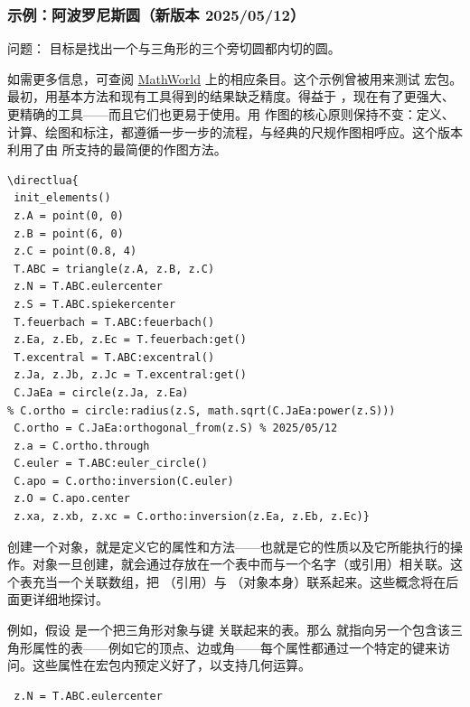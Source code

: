 \subsubsection{示例：阿波罗尼斯圆（新版本 2025/05/12）}
\label{ssub:example_apollonius_circle}

\begin{mybox}{问题：}
目标是找出一个与三角形的三个旁切圆都内切的圆。\end{mybox}


如需更多信息，可查阅 \href{https://mathworld.wolfram.com/ApolloniusCircle.html}{MathWorld} 上的相应条目。这个示例曾被用来测试  宏包。最初，用基本方法和现有工具得到的结果缺乏精度。得益于 ，现在有了更强大、更精确的工具——而且它们也更易于使用。用  作图的核心原则保持不变：定义、计算、绘图和标注，都遵循一步一步的流程，与经典的尺规作图相呼应。这个版本利用了由  所支持的最简便的作图方法。


\begin{mybox}
\begin{verbatim}
\directlua{
 init_elements()
 z.A = point(0, 0)
 z.B = point(6, 0)
 z.C = point(0.8, 4)
 T.ABC = triangle(z.A, z.B, z.C)
 z.N = T.ABC.eulercenter
 z.S = T.ABC.spiekercenter
 T.feuerbach = T.ABC:feuerbach()
 z.Ea, z.Eb, z.Ec = T.feuerbach:get()
 T.excentral = T.ABC:excentral()
 z.Ja, z.Jb, z.Jc = T.excentral:get()
 C.JaEa = circle(z.Ja, z.Ea)
% C.ortho = circle:radius(z.S, math.sqrt(C.JaEa:power(z.S)))
 C.ortho = C.JaEa:orthogonal_from(z.S) % 2025/05/12
 z.a = C.ortho.through
 C.euler = T.ABC:euler_circle()
 C.apo = C.ortho:inversion(C.euler)
 z.O = C.apo.center
 z.xa, z.xb, z.xc = C.ortho:inversion(z.Ea, z.Eb, z.Ec)}
\end{verbatim}
\end{mybox}

创建一个对象，就是定义它的属性和方法——也就是它的性质以及它所能执行的操作。对象一旦创建，就会通过存放在一个表中而与一个名字（或引用）相关联。这个表充当一个关联数组，把 （引用）与 （对象本身）联系起来。这些概念将在后面更详细地探讨。

例如，假设  是一个把三角形对象与键  关联起来的表。那么  就指向另一个包含该三角形属性的表——例如它的顶点、边或角——每个属性都通过一个特定的键来访问。这些属性在宏包内预定义好了，以支持几何运算。

\vspace{1em}
\begin{mybox}
\begin{verbatim}
 z.N = T.ABC.eulercenter
\end{verbatim}
\end{mybox}

